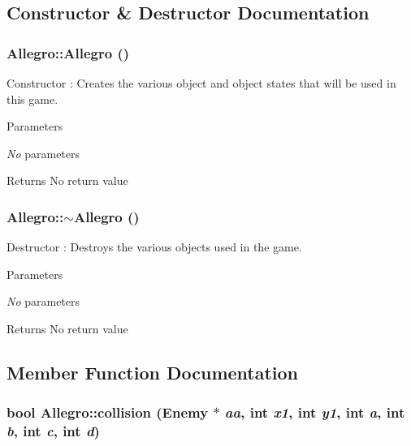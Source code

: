 \subsection{Constructor \& Destructor Documentation}
\hypertarget{classAllegro_a3f5c52ac57364f5587d88766ed75476e}{
\subsubsection[{Allegro}]{\setlength{\rightskip}{0pt plus 5cm}Allegro::Allegro ()}}
\label{classAllegro_a3f5c52ac57364f5587d88766ed75476e}


Constructor : Creates the various object and object states that will be used in this game. 
\begin{DoxyParams}{Parameters}
\item[{\em No}]parameters \end{DoxyParams}
\begin{DoxyReturn}{Returns}
No return value 
\end{DoxyReturn}
\hypertarget{classAllegro_aaa80b9c26288f9d8d9888fc398d91b6c}{
\subsubsection[{$\sim$Allegro}]{\setlength{\rightskip}{0pt plus 5cm}Allegro::$\sim$Allegro ()}}
\label{classAllegro_aaa80b9c26288f9d8d9888fc398d91b6c}


Destructor : Destroys the various objects used in the game. 
\begin{DoxyParams}{Parameters}
\item[{\em No}]parameters \end{DoxyParams}
\begin{DoxyReturn}{Returns}
No return value 
\end{DoxyReturn}


\subsection{Member Function Documentation}
\hypertarget{classAllegro_a10d4912b8dfc5b7b5a13db103e441bfe}{
\subsubsection[{collision}]{\setlength{\rightskip}{0pt plus 5cm}bool Allegro::collision ({\bf Enemy} $\ast$ {\em aa}, \/  int {\em x1}, \/  int {\em y1}, \/  int {\em a}, \/  int {\em b}, \/  int {\em c}, \/  int {\em d})}}
\label{classAllegro_a10d4912b8dfc5b7b5a13db103e441bfe}


